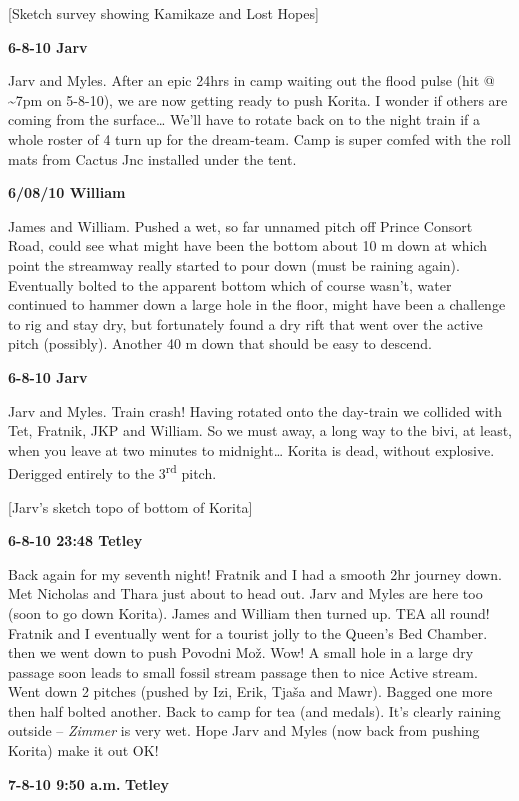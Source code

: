{[}Sketch survey showing Kamikaze and Lost Hopes{]}

\textbf{6-8-10 Jarv}

Jarv and Myles. After an epic 24hrs in camp waiting out the flood pulse
(hit @ \textasciitilde 7pm on 5-8-10), we are now getting ready to push
Korita. I wonder if others are coming from the surface\ldots{} We'll
have to rotate back on to the night train if a whole roster of 4 turn up
for the dream-team. Camp is super comfed with the roll mats from Cactus
Jnc installed under the tent.

\textbf{6/08/10 William}

James and William. Pushed a wet, so far unnamed pitch off Prince Consort
Road, could see what might have been the bottom about 10 m down at which
point the streamway really started to pour down (must be raining again).
Eventually bolted to the apparent bottom which of course wasn't, water
continued to hammer down a large hole in the floor, might have been a
challenge to rig and stay dry, but fortunately found a dry rift that
went over the active pitch (possibly). Another 40 m down that should be
easy to descend.

\textbf{6-8-10 Jarv}

Jarv and Myles. Train crash! Having rotated onto the day-train we
collided with Tet, Fratnik, JKP and William. So we must away, a long way
to the bivi, at least, when you leave at two minutes to midnight\ldots{}
Korita is dead, without explosive. Derigged entirely to the
3\textsuperscript{rd} pitch.

{[}Jarv's sketch topo of bottom of Korita{]}

\textbf{6-8-10 23:48 Tetley}

Back again for my seventh night! Fratnik and I had a smooth 2hr journey
down. Met Nicholas and Thara just about to head out. Jarv and Myles are
here too (soon to go down Korita). James and William then turned up. TEA
all round! Fratnik and I eventually went for a tourist jolly to the
Queen's Bed Chamber. then we went down to push Povodni Mož. Wow! A small
hole in a large dry passage soon leads to small fossil stream passage
then to nice Active stream. Went down 2 pitches (pushed by Izi, Erik,
Tjaša and Mawr). Bagged one more then half bolted another. Back to camp
for tea (and medals). It's clearly raining outside -- \emph{Zimmer} is
very wet. Hope Jarv and Myles (now back from pushing Korita) make it out
OK!

\textbf{7-8-10 9:50 a.m.} \textbf{Tetley}

